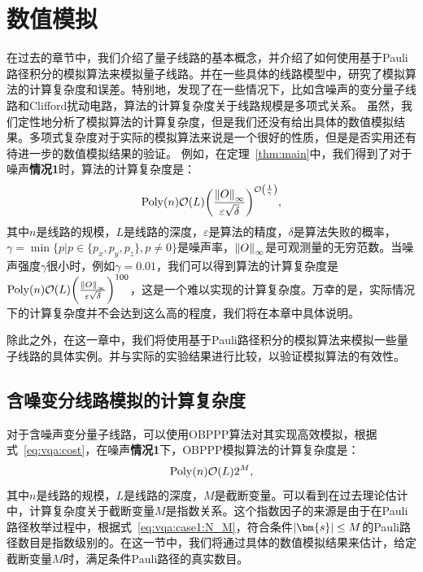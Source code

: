 \chapter{数值模拟}

在过去的章节中，我们介绍了量子线路的基本概念，并介绍了如何使用基于Pauli路径积分的模拟算法来模拟量子线路。并在一些具体的线路模型中，研究了模拟算法的计算复杂度和误差。特别地，发现了在一些情况下，比如含噪声的变分量子线路和Clifford扰动电路，算法的计算复杂度关于线路规模是多项式关系。
虽然，我们定性地分析了模拟算法的计算复杂度，但是我们还没有给出具体的数值模拟结果。多项式复杂度对于实际的模拟算法来说是一个很好的性质，但是是否实用还有待进一步的数值模拟结果的验证。
例如，在定理~\ref{thm:main}中，我们得到了对于噪声\textbf{情况1}时，算法的计算复杂度是：
\begin{equation*}
    \mathrm{Poly}(n) \order{L} \bigg(\frac{\norm{O}_\infty}{\varepsilon \sqrt{\delta}} \bigg)^{\order{\frac{1}{\gamma}}},
\end{equation*}
其中$n$是线路的规模，$L$是线路的深度，$\varepsilon$是算法的精度，$\delta$是算法失败的概率，$\gamma=\min\{p|{p \in \{p_x,p_y,p_z\},p\neq 0}\}$是噪声率，$\norm{O}_\infty$是可观测量的无穷范数。当噪声强度$\gamma$很小时，例如$\gamma=0.01$，我们可以得到算法的计算复杂度是$\mathrm{Poly}(n) \order{L} \bigg(\frac{\norm{O}_\infty}{\varepsilon \sqrt{\delta}} \bigg)^{{100}}$，这是一个难以实现的计算复杂度。万幸的是，实际情况下的计算复杂度并不会达到这么高的程度，我们将在本章中具体说明。

除此之外，在这一章中，我们将使用基于Pauli路径积分的模拟算法来模拟一些量子线路的具体实例。并与实际的实验结果进行比较，以验证模拟算法的有效性。




\section{含噪变分线路模拟的计算复杂度}
对于含噪声变分量子线路，可以使用OBPPP算法对其实现高效模拟，根据式~\eqref{eq:vqa:cost}，在噪声\textbf{情况1}下，OBPPP模拟算法的计算复杂度是：
\begin{equation*}
    \mathrm{Poly}(n) \order{L}2^M,
\end{equation*}
其中$n$是线路的规模，$L$是线路的深度，$M$是截断变量。可以看到在过去理论估计中，计算复杂度关于截断变量$M$是指数关系。这个指数因子的来源是由于在Pauli 路径枚举过程中，根据式~\eqref{eq:vqa:case1:N_M}，符合条件$\abs{\bm{s}}\leq M$的Pauli路径数目是指数级别的。在这一节中，我们将通过具体的数值模拟结果来估计，给定截断变量$M$时，满足条件Pauli路径的真实数目。



